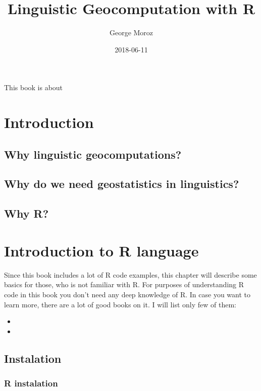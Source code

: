 \documentclass[]{book}
\title{Linguistic Geocomputation with R}
\author{George Moroz}
\date{2018-06-11}
\theoremstyle{definition}
\theoremstyle{definition}
\theoremstyle{definition}
\theoremstyle{remark}
\begin{document}
\maketitle

{
\setcounter{tocdepth}{1}
\tableofcontents
}
This book is about

\chapter{Introduction}\label{intro}

\section{Why linguistic
geocomputations?}\label{why-linguistic-geocomputations}

\section{Why do we need geostatistics in
linguistics?}\label{why-do-we-need-geostatistics-in-linguistics}

\section{Why R?}\label{why-r}

\chapter{Introduction to R language}\label{introduction-to-r-language}

Since this book includes a lot of R code examples, this chapter will
describe some basics for those, who is not familiar with R. For purposes
of understanding R code in this book you don't need any deep knowledge
of R. In case you want to learn more, there are a lot of good books on
it. I will list only few of them:

\begin{itemize}
\item
\item
\end{itemize}

\section{Instalation}\label{instalation}

\subsection{R instalation}\label{r-instalation}
\end{document}
